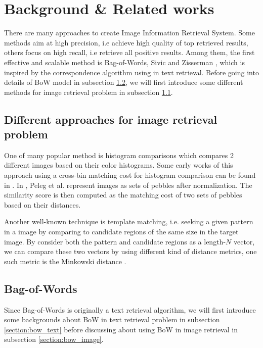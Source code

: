 \documentclass[10pt,conference,]{IEEEtran}
\begin{document}
\section{Background \& Related works} \label{section:background_relatedworks}
There are many approaches to create Image Information Retrieval System. Some methods aim at high precision, i.e achieve high quality of top retrieved results, others focus on high recall, i.e retrieve all positive results. Among them, the first effective and scalable method is Bag-of-Words, Sivic and Zisserman \cite{3}, which is inspired by the correspondence algorithm using in text retrieval. Before going into details of BoW model in subsection \ref{section:background_bow}, we will first introduce some different methods for image retrieval problem in subsection \ref{section:background_dif_method}.

\subsection{Different approaches for image retrieval problem} \label{section:background_dif_method}
One of many popular method is histogram comparisons which compares 2 different images based on their color histograms. Some early works of this approach using a cross-bin matching cost for histogram comparison can be found in \cite{Shen1983187, Werman1985328, Peleg192468}. In \cite{Peleg192468}, Peleg et al. represent images as sets of pebbles after normalization. The similarity score is then computed as the matching cost of two sets of pebbles based on their distances.

Another well-known technique is template matching, i.e. seeking a given pattern in a image by comparing to candidate regions of the same size in the target image. By consider both the pattern and candidate regions as a length-$N$ vector, we can compare these two vectors by using different kind of distance metrics, one such metric is the Minkowski distance \cite{Ouyang5770267}.

\subsection{Bag-of-Words}\label{section:background_bow}

Since Bag-of-Words is originally a text retrieval algorithm, we will first introduce some backgrounds about BoW in text retrieval problem in subsection \ref{section:bow_text} before discussing about using BoW in image retrieval in subsection \ref{section:bow_image}.
\end{document}
